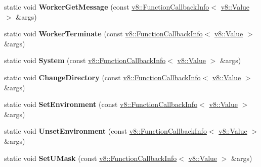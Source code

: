 \begin{DoxyCompactItemize}
static void {\bfseries Worker\+Get\+Message} (const \mbox{\hyperlink{classv8_1_1FunctionCallbackInfo}{v8\+::\+Function\+Callback\+Info}}$<$ \mbox{\hyperlink{classv8_1_1Value}{v8\+::\+Value}} $>$ \&args)
\item 
\mbox{\label{classv8_1_1Shell_aec3f8248244ba8b07d56446236272b20}} 
static void {\bfseries Worker\+Terminate} (const \mbox{\hyperlink{classv8_1_1FunctionCallbackInfo}{v8\+::\+Function\+Callback\+Info}}$<$ \mbox{\hyperlink{classv8_1_1Value}{v8\+::\+Value}} $>$ \&args)
\item 
\mbox{\label{classv8_1_1Shell_ae09de0795a893adba7512629563cc340}} 
static void {\bfseries System} (const \mbox{\hyperlink{classv8_1_1FunctionCallbackInfo}{v8\+::\+Function\+Callback\+Info}}$<$ \mbox{\hyperlink{classv8_1_1Value}{v8\+::\+Value}} $>$ \&args)
\item 
\mbox{\label{classv8_1_1Shell_aa08a16a91023b749f2d9e0956c8200e1}} 
static void {\bfseries Change\+Directory} (const \mbox{\hyperlink{classv8_1_1FunctionCallbackInfo}{v8\+::\+Function\+Callback\+Info}}$<$ \mbox{\hyperlink{classv8_1_1Value}{v8\+::\+Value}} $>$ \&args)
\item 
\mbox{\label{classv8_1_1Shell_a0977b415540cff06625e711b5d3e2625}} 
static void {\bfseries Set\+Environment} (const \mbox{\hyperlink{classv8_1_1FunctionCallbackInfo}{v8\+::\+Function\+Callback\+Info}}$<$ \mbox{\hyperlink{classv8_1_1Value}{v8\+::\+Value}} $>$ \&args)
\item 
\mbox{\label{classv8_1_1Shell_ae7ac04fd17a20acf9fb66812b611170e}} 
static void {\bfseries Unset\+Environment} (const \mbox{\hyperlink{classv8_1_1FunctionCallbackInfo}{v8\+::\+Function\+Callback\+Info}}$<$ \mbox{\hyperlink{classv8_1_1Value}{v8\+::\+Value}} $>$ \&args)
\item 
\mbox{\label{classv8_1_1Shell_af3f66a1cd6b81cd69e43e9453092b50f}} 
static void {\bfseries Set\+U\+Mask} (const \mbox{\hyperlink{classv8_1_1FunctionCallbackInfo}{v8\+::\+Function\+Callback\+Info}}$<$ \mbox{\hyperlink{classv8_1_1Value}{v8\+::\+Value}} $>$ \&args)
\item 
\mbox{\label{classv8_1_1Shell_a739dd021cf5875fe3b5372d4db31dbc3}} 

\end{DoxyCompactItemize}

